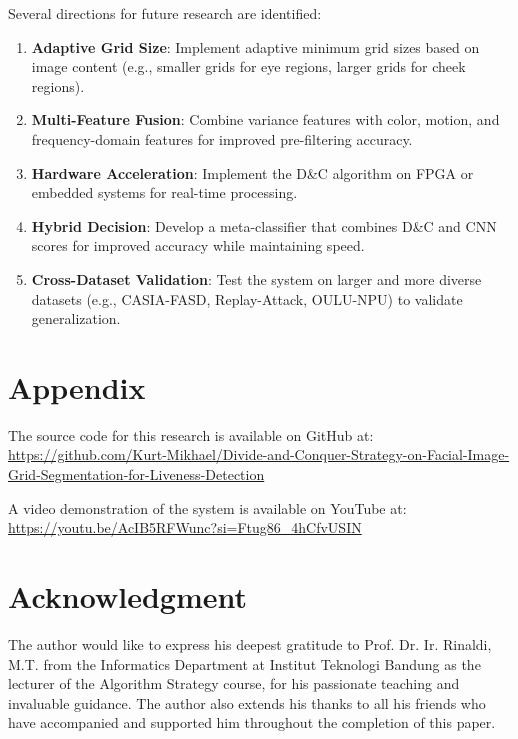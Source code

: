 \documentclass[conference]{IEEEtran}
\begin{document}
Several directions for future research are identified:

\begin{enumerate}
    \item \textbf{Adaptive Grid Size}: Implement adaptive minimum grid sizes based on image content (e.g., smaller grids for eye regions, larger grids for cheek regions).
    \item \textbf{Multi-Feature Fusion}: Combine variance features with color, motion, and frequency-domain features for improved pre-filtering accuracy.
    \item \textbf{Hardware Acceleration}: Implement the D\&C algorithm on FPGA or embedded systems for real-time processing.
    \item \textbf{Hybrid Decision}: Develop a meta-classifier that combines D\&C and CNN scores for improved accuracy while maintaining speed.
    \item \textbf{Cross-Dataset Validation}: Test the system on larger and more diverse datasets (e.g., CASIA-FASD, Replay-Attack, OULU-NPU) to validate generalization.
\end{enumerate}

\section*{Appendix}

The source code for this research is available on GitHub at:\\
\url{https://github.com/Kurt-Mikhael/Divide-and-Conquer-Strategy-on-Facial-Image-Grid-Segmentation-for-Liveness-Detection}

A video demonstration of the system is available on YouTube at:\\
\url{https://youtu.be/AcIB5RFWunc?si=Ftug86_4hCfvUSIN}

\section*{Acknowledgment}

The author would like to express his deepest gratitude to Prof. Dr. Ir. Rinaldi, M.T. from the Informatics Department at Institut Teknologi Bandung as the lecturer of the Algorithm Strategy course, for his passionate teaching and invaluable guidance. The author also extends his thanks to all his friends who have accompanied and supported him throughout the completion of this paper.
\end{document}

